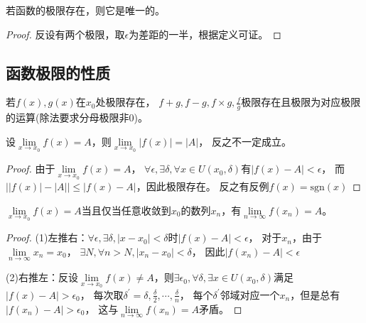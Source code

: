 \begin{theorem}[极限的唯一性]
  若函数的极限存在，则它是唯一的。
\end{theorem}

\begin{proof}
  反设有两个极限，取$\epsilon$为差距的一半，根据定义可证。
\end{proof}


\subsection{函数极限的性质}


\begin{theorem}[函数极限四则运算]
  若$f(x), g(x)$在$x_0$处极限存在，
  $f+g, f-g, f \times g, \frac{f}{g}$极限存在且极限为对应极限的运算(除法要求分母极限非0)。
\end{theorem}

\begin{exercise}[函数绝对值的极限]
  设$\lim \limits _{x \rightarrow x_0}f(x) = A$，则$\lim \limits _{x \rightarrow x_0}|f(x)| = |A|$，
  反之不一定成立。
\end{exercise}

\begin{proof}
  由于$\lim \limits _{x \rightarrow x_0}f(x) = A$，
  $\forall \epsilon, \exists \delta, \forall x \in U(x_0,\delta)$有$|f(x) - A| < \epsilon$，
  而$\left| |f(x)| - |A| \right| \leq |f(x) - A|$，因此极限存在。
  反之有反例$f(x) = \text{sgn}(x)$
\end{proof}

\begin{theorem}[归结原则] \label{thm:数列极限与函数极限}
  $\lim \limits _{x \rightarrow x_0} f(x) = A$当且仅当任意收敛到$x_0$的数列$x_n$，有$\lim \limits _{n \rightarrow \infty} f(x_n) = A$。
\end{theorem}

\begin{proof}
  (1)左推右：$\forall \epsilon, \exists \delta, |x - x_0| < \delta$时$|f(x) - A| < \epsilon$，
  对于$x_n$，由于$\lim \limits _{n \rightarrow \infty} x_n = x_0$，
  $\exists N, \forall n > N, |x_n - x_0| < \delta$，
  因此$|f(x_n) - A|< \epsilon$

  (2)右推左：反设$\lim \limits _{x \rightarrow x_0}f(x) \neq A$，则$\exists \epsilon_0, \forall \delta,\exists x \in U(x_0,\delta)$满足
  $|f(x) - A| > \epsilon_0$，
  每次取$\delta^{\prime} = \delta,\frac{\delta}{2},\cdots,\frac{\delta}{n}$，
  每个$\delta^{\prime}$邻域对应一个$x_n$，但是总有$|f(x_n) - A| > \epsilon_0$，
  这与$\lim \limits _{n \rightarrow \infty} f(x_n) = A$矛盾。
\end{proof}

